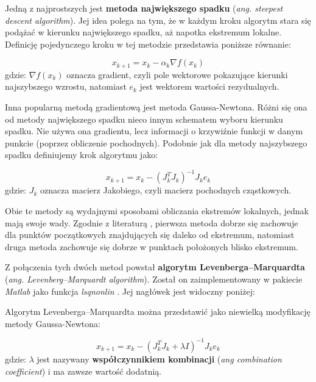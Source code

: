 \documentclass{pracamgr}
\begin{document}
Jedną z najprostszych jest \textbf{metoda największego spadku} (\textit{ang. steepest descent algorithm}). Jej idea polega na tym, że w każdym kroku algorytm stara się podążać w kierunku największego spadku, aż napotka ekstremum lokalne. Definicję pojedynczego kroku w tej metodzie 
przedstawia poniższe równanie:


\begin{equation}
  x_{k+1} = x_k - \alpha_k \nabla f(x_k)
\end{equation}
gdzie: $\nabla f(x_k)$ oznacza gradient, czyli pole wektorowe pokazujące kierunki najszybszego wzrostu, natomiast $e_k$ jest wektorem wartości rezydualnych.


Inna popularną metodą gradientową jest metoda Gaussa-Newtona. Różni się ona od metody największego spadku nieco innym schematem wyboru kierunku spadku. Nie używa ona gradientu, 
lecz informacji o krzywiźnie funkcji w danym punkcie (poprzez obliczenie pochodnych).
Podobnie jak dla metody najszybszego spadku definiujemy krok algorytmu jako:


\begin{equation}
  x_{k+1} = x_k - (J_k^TJ_k)^{-1}J_k e_k
\end{equation}
gdzie: $J_k$ oznacza macierz Jakobiego, czyli macierz pochodnych cząstkowych.

Obie te metody są wydajnymi sposobami obliczania ekstremów lokalnych, jednak mają swoje wady.
Zgodnie z literaturą \cite{LM}, pierwsza metoda dobrze się zachowuje dla punktów początkowych znajdujących się daleko od ekstremum, natomiast druga metoda zachowuje się dobrze w punktach położonych blisko ekstremum. 

Z połączenia tych dwóch metod powstał \textbf{algorytm Levenberga–Marquardta} (\textit{ang. Levenberg–Marquardt algorithm}). Został on zaimplementowany w pakiecie \textit{Matlab} jako
funkcja \textit{lsqnonlin} \cite{NonLinear}. Jej nagłówek jest widoczny poniżej:


Algorytm Levenberga–Marquardta można przedstawić jako niewielką modyfikację metody Gaussa-Newtona:


\begin{equation} 
  x_{k+1} = x_k - (J_k^TJ_k + \lambda I)^{-1}J_k e_k
\end{equation}
gdzie: $\lambda$ jest nazywany \textbf{współczynnikiem kombinacji} (\textit{ang combination coefficient}) i ma zawsze wartość dodatnią.
\end{document}
